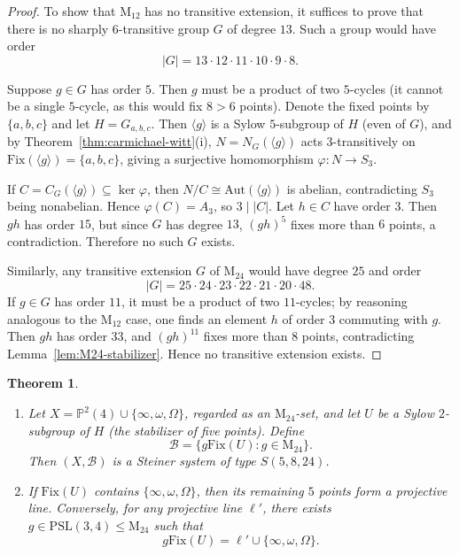 \documentclass[12pt,a4paper,openany]{book}
\newtheorem{theorem}{Theorem}[section]
\newcommand{\PSL}{\mathrm{PSL}}
\newcommand{\Aut}{\mathrm{Aut}}
\newcommand{\Fix}{\mathrm{Fix}}
\renewcommand{\PSL}{\mathrm{PSL}}
\renewcommand{\PSL}{\mathrm{PSL}}
\newcommand{\PP}{\mathbb{P}}
\begin{document}
\begin{proof}
To show that $\mathrm{M}_{12}$ has no transitive extension, it suffices to prove that there is no sharply $6$-transitive group $G$ of degree $13$. Such a group would have order
\[
|G| = 13 \cdot 12 \cdot 11 \cdot 10 \cdot 9 \cdot 8.
\]

Suppose $g \in G$ has order $5$. Then $g$ must be a product of two $5$-cycles (it cannot be a single $5$-cycle, as this would fix $8 > 6$ points). Denote the fixed points by $\{a,b,c\}$ and let $H = G_{a,b,c}$. Then $\langle g \rangle$ is a Sylow $5$-subgroup of $H$ (even of $G$), and by Theorem~\ref{thm:carmichael-witt}(i), $N = N_G(\langle g \rangle)$ acts $3$-transitively on $\Fix(\langle g \rangle) = \{a,b,c\}$, giving a surjective homomorphism $\varphi : N \to S_3$.

If $C = C_G(\langle g \rangle) \subseteq \ker \varphi$, then $N/C \cong \Aut(\langle g \rangle)$ is abelian, contradicting $S_3$ being nonabelian. Hence $\varphi(C) = A_3$, so $3 \mid |C|$. Let $h \in C$ have order $3$. Then $gh$ has order $15$, but since $G$ has degree $13$, $(gh)^5$ fixes more than $6$ points, a contradiction. Therefore no such $G$ exists.

Similarly, any transitive extension $G$ of $\mathrm{M}_{24}$ would have degree $25$ and order
\[
|G| = 25 \cdot 24 \cdot 23 \cdot 22 \cdot 21 \cdot 20 \cdot 48.
\]
If $g \in G$ has order $11$, it must be a product of two $11$-cycles; by reasoning analogous to the $\mathrm{M}_{12}$ case, one finds an element $h$ of order $3$ commuting with $g$. Then $gh$ has order $33$, and $(gh)^{11}$ fixes more than $8$ points, contradicting Lemma~\ref{lem:M24-stabilizer}. Hence no transitive extension exists.
\end{proof}

\begin{theorem}\label{thm:S58}
\begin{enumerate}[label=(\roman*)]
    \item Let $X = \PP^2(4) \cup \{\infty, \omega, \Omega\}$, regarded as an $\mathrm{M}_{24}$-set, and let $U$ be a Sylow $2$-subgroup of $H$ (the stabilizer of five points). Define
    \[
    \mathscr{B} = \{ g \Fix(U) : g \in \mathrm{M}_{24} \}.
    \]
    Then $(X, \mathscr{B})$ is a Steiner system of type $S(5,8,24)$.
    
    \item If $\Fix(U)$ contains $\{\infty, \omega, \Omega\}$, then its remaining $5$ points form a projective line. Conversely, for any projective line $\ell'$, there exists $g \in \PSL(3,4) \le \mathrm{M}_{24}$ such that
    \[
    g \Fix(U) = \ell' \cup \{\infty, \omega, \Omega\}.
    \]
\end{enumerate}
\end{theorem}
\end{document}
